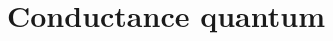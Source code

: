\hypertarget{group___conductance_quantum}{}\section{Conductance quantum}
\label{group___conductance_quantum}
